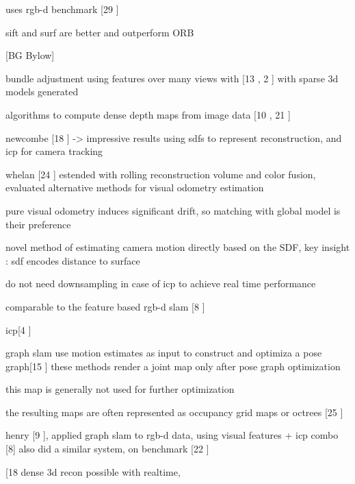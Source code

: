 uses rgb-d benchmark [29 \cite{Sturm11Towards}]

sift and surf are better and outperform ORB















[BG Bylow]

bundle adjustment using features over many views with [13 \cite{Klein07Parallel} , 2 \cite{Agarwal09Building}] with sparse 3d models generated

algorithms to compute dense depth maps from image data [10 \cite{Hirschmuller05Accurate} , 21 \cite{Stuhmer10Real}]

newcombe [18 \cite{Newcombe11Kinectfusion} ] -> impressive results using sdfs to represent reconstruction, and icp for camera tracking

whelan [24 \cite{Whelan13Robust}] estended with rolling reconstruction volume and color fusion, evaluated alternative methods for visual odometry estimation

pure visual odometry induces significant drift, so matching with global model is their preference

novel method of estimating camera motion directly based on the SDF, key insight : sdf encodes distance to surface

do not need downsampling in case of icp to achieve real time performance

comparable to the feature based rgb-d slam [8 \cite{Endres12Evaluation}]

icp[4 \cite{Besl92Method}]

graph slam use motion estimates as input to construct and optimiza a pose graph[15 \cite{Kummerle11G}] these methods render a joint map only after pose graph optimization

this map is generally not used for further optimization

the resulting maps are often represented as occupancy grid maps or octrees [25 \cite{Wurm10Octomap}]

henry [9 \cite{Henry10Rgb}], applied graph slam to rgb-d data, using visual features + icp combo [8] also did a similar system, on benchmark [22 \cite{Sturm12Benchmark}]

[18 \cite{Newcombe11Kinectfusion} dense 3d recon possible with realtime, 

